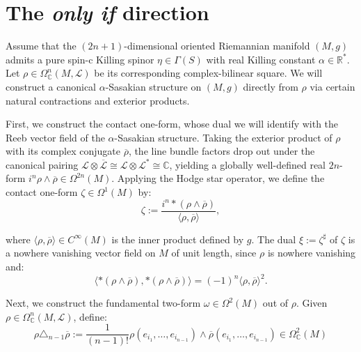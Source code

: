 \documentclass[10pt,a4paper,twoside,reqno]{amsart}
\theoremstyle{plain}
\theoremstyle{definition}
\theoremstyle{remark}
\def\cL{\mathcal{L}}
\newcommand{\escal}[1]{\langle#1\rangle}
\begin{document}
\section{The \emph{only if} direction}
\label{sec:onlyif}


Assume that the $(2n+1)$-dimensional oriented Riemannian manifold $(M,g)$ admits a pure spin-c Killing spinor $\eta \in \Gamma(S)$ with real Killing constant $\alpha\in\mathbb{R}^{\ast}$. Let $\rho \in \Omega^n_{\mathbb{C}}(M, \mathcal{L})$ be its corresponding complex-bilinear square. We will construct a canonical $\alpha$-Sasakian structure on $(M,g)$ directly from $\rho$ via certain natural contractions and exterior products.\medskip

First, we construct the contact one-form, whose dual we will identify with the Reeb vector field of the $\alpha$-Sasakian structure. Taking the exterior product of $\rho$ with its complex conjugate $\overline{\rho}$, the line bundle factors drop out under the canonical pairing $\mathcal{L} \otimes \overline{{\mathcal{L}}}\cong\mathcal{L}\otimes\mathcal{L}^\ast\cong\mathbb{C}$, yielding a globally well-defined real $2n$-form $i^n\rho \wedge \overline{\rho} \in \Omega^{2n}(M)$. Applying the Hodge star operator, we define the contact one-form $\zeta \in \Omega^1(M)$ by:
\begin{equation*}
\zeta := \frac{i^n*(\rho\wedge\overline{\rho})}{\escal{\rho,\overline{\rho}}},
\end{equation*}

\noindent
where $\langle \rho, \overline{\rho} \rangle \in C^{\infty}(M)$ is the inner product defined by $g$. The dual $\xi := \zeta^\sharp$ of $\zeta$ is a nowhere vanishing vector field on $M$ of unit length, since $\rho$ is nowhere vanishing and:
\begin{equation*}
\escal{*(\rho\wedge\overline{\rho}),*(\rho\wedge\overline{\rho})}=(-1)^n\escal{\rho,\overline{\rho}}^2.
\end{equation*}

\noindent
Next, we construct the fundamental two-form $\omega \in \Omega^2(M)$ out of $\rho$. Given $\rho\in \Omega^n_{\mathbb{C}}(M,\cL)$, define:
\begin{equation*}
\rho \triangle_{n-1} \overline{\rho} := \frac{1}{(n-1)!} \rho(e_{i_1},\hdots , e_{i_{n-1}}) \wedge \overline{\rho}(e_{i_1},\hdots , e_{i_{n-1}})\in \Omega^2_{\mathbb{C}}(M)
\end{equation*}
\end{document}
